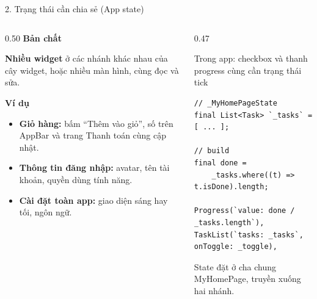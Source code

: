 \documentclass[aspectratio=169,11pt]{beamer}
\newcommand{\ma}[1]{{\ttfamily\small #1}}
\newcommand{\chot}[1]{%
  \par\vspace{2.5mm}%
  \colorbox{nenhop}{\parbox{\dimexpr\linewidth-2\fboxsep\relax}{\raggedright\small\color{chinh}#1}}}
\newcommand{\nhanma}[1]{{\scriptsize\color{xam}#1\par}\vspace{0.8mm}}
\begin{document}
\begin{frame}[fragile]{2. Trạng thái cần chia sẻ (App state)}
  \begin{columns}[T,onlytextwidth]
    \begin{column}{0.50\textwidth}
      \textbf{\color{chinh}Bản chất}\par\vspace{0.8mm}
      \textbf{Nhiều widget} ở các nhánh khác nhau của cây widget, hoặc nhiều màn hình,
      cùng đọc và sửa.
      \par\vspace{2.5mm}
      \textbf{\color{chinh}Ví dụ}
      \begin{itemize}
        \item \textbf{Giỏ hàng:} bấm ``Thêm vào giỏ'', số trên AppBar và trang
              Thanh toán cùng cập nhật.
        \item \textbf{Thông tin đăng nhập:} avatar, tên tài khoản, quyền dùng tính năng.
        \item \textbf{Cài đặt toàn app:} giao diện sáng hay tối, ngôn ngữ.
      \end{itemize}
    \end{column}
    \begin{column}{0.47\textwidth}
      \nhanma{Trong app: checkbox và thanh progress cùng cần trạng thái tick}
\begin{lstlisting}
// _MyHomePageState
final List<Task> `_tasks` = [ ... ];

// build
final done =
    _tasks.where((t) => t.isDone).length;

Progress(`value: done / _tasks.length`),
TaskList(`tasks: _tasks`, onToggle: _toggle),
\end{lstlisting}
      \chot{State đặt ở cha chung \ma{MyHomePage}, truyền xuống hai nhánh.}
    \end{column}
  \end{columns}
\end{frame}
\end{document}

